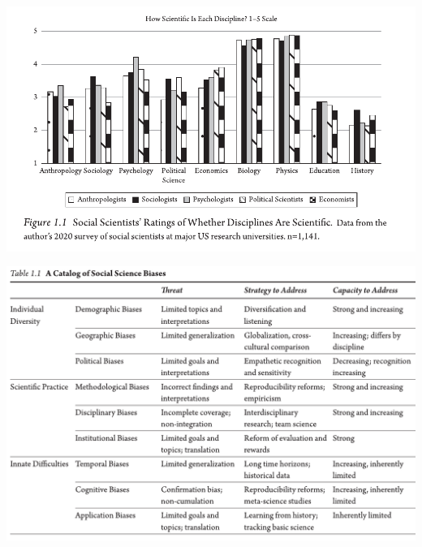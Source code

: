 \documentclass[
  10pt,
  ignorenonframetext,
]{beamer}
\begin{document}
\begin{frame}
\begin{center}\includegraphics[width=1\linewidth]{Figs/subject_done} \end{center}
\end{frame}

\begin{frame}
\begin{center}\includegraphics[width=1\linewidth]{Figs/biases_done} \end{center}
\end{frame}
\end{document}
